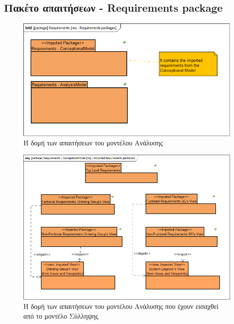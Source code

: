 \documentclass[a4paper,12pt,twoside]{report}
\begin{document}
\begin{appendices}
			\FloatBarrier
			\subsection{Πακέτο απαιτήσεων - Requirements package}

			\clearpage
			\begin{figure}[hp]
					\centering
					\includegraphics[scale=0.30]{AnalysisModel_req-Requirementspackages.png}
					\caption{Η δομή των απαιτήσεων του μοντέλου Ανάλυσης}
					\label{φωτ:Η δομή των απαιτήσεων του μοντέλου Ανάλυσης}
			\end{figure}
			
			\begin{figure}[hp]
					\centering
					\includegraphics[scale=0.30]{AnalysisModel_pkg-ImportedRequirementspackages.png}
					\caption{Η δομή των απαιτήσεων του μοντέλου Ανάλυσης που έχουν εισαχθεί από το μοντέλο Σύλληψης}
					\label{φωτ:Η δομή των απαιτήσεων του μοντέλου Ανάλυσης που έχουν εισαχθεί από το μοντέλο Σύλληψης}
			\end{figure}
			

\end{appendices}
\end{document}
